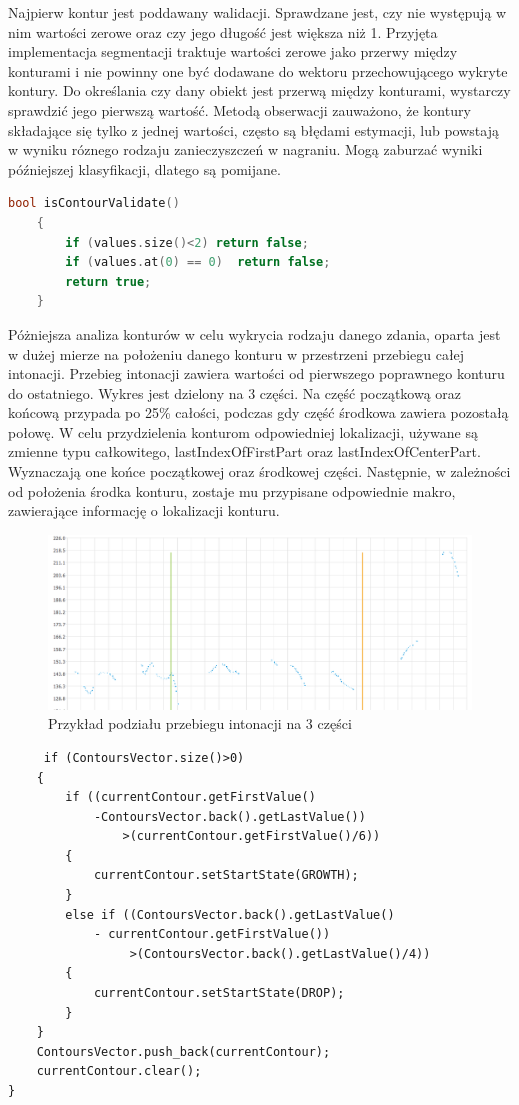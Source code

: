 \documentclass[a4paper,12 pt]{article}
\begin{document}
Najpierw kontur jest poddawany walidacji. Sprawdzane jest, czy nie występują w nim wartości zerowe oraz czy jego długość jest większa niż 1. Przyjęta implementacja segmentacji traktuje wartości zerowe jako przerwy między konturami i nie powinny one być dodawane do wektoru przechowującego wykryte kontury. Do określania czy dany obiekt jest przerwą między konturami, wystarczy sprawdzić jego pierwszą wartość.
Metodą obserwacji zauważono, że kontury składające się tylko z jednej wartości, często są błędami estymacji, lub powstają w wyniku róznego rodzaju zanieczyszczeń w nagraniu. Mogą zaburzać wyniki późniejszej klasyfikacji, dlatego są pomijane.
\begin{lstlisting}[caption={Funkcja dokonująca walidacji konturu},label={lst:label},language=C++]
    bool isContourValidate()
    {
        if (values.size()<2) return false;
        if (values.at(0) == 0)  return false;
        return true;
    }
\end{lstlisting}
Póżniejsza analiza konturów w celu wykrycia rodzaju danego zdania, oparta jest w dużej mierze na położeniu danego konturu w przestrzeni przebiegu całej intonacji. Przebieg intonacji zawiera wartości od pierwszego poprawnego konturu do ostatniego. Wykres jest dzielony na 3 części. Na część początkową oraz końcową przypada po 25\% całości, podczas gdy część środkowa zawiera pozostałą połowę.
W celu przydzielenia konturom odpowiedniej lokalizacji, używane są zmienne typu całkowitego, lastIndexOfFirstPart oraz lastIndexOfCenterPart. Wyznaczają one końce początkowej oraz środkowej części. Następnie, w zależności od położenia środka konturu, zostaje mu przypisane odpowiednie makro, zawierające informację o lokalizacji konturu.
 \FloatBarrier
\begin{figure}[h]
\centering
\includegraphics[scale=0.7]{podzial_wykresu.png}
\caption{Przykład podziału przebiegu intonacji na 3 części}
\end{figure}
\FloatBarrier
\begin{lstlisting}
     if (ContoursVector.size()>0)
    {
        if ((currentContour.getFirstValue()
        	-ContoursVector.back().getLastValue())
                >(currentContour.getFirstValue()/6))
        {
            currentContour.setStartState(GROWTH);
        }
        else if ((ContoursVector.back().getLastValue() 
        	- currentContour.getFirstValue())
                 >(ContoursVector.back().getLastValue()/4))
        {
            currentContour.setStartState(DROP);
        }
    }
    ContoursVector.push_back(currentContour);
    currentContour.clear();
}
\end{lstlisting}
\end{document}
